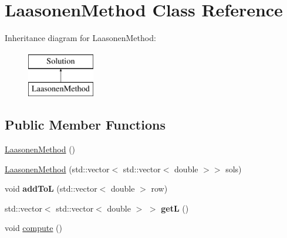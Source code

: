 \hypertarget{class_laasonen_method}{}\section{Laasonen\+Method Class Reference}
\label{class_laasonen_method}
Inheritance diagram for Laasonen\+Method\+:\begin{figure}[H]
\begin{center}
\leavevmode
\includegraphics[height=2.000000cm]{class_laasonen_method}
\end{center}
\end{figure}
\subsection*{Public Member Functions}
\begin{DoxyCompactItemize}
\item 
\hyperlink{class_laasonen_method_a1bff2dc73fc66c3070fc7a187ff556f9}{Laasonen\+Method} ()
\item 
\hyperlink{class_laasonen_method_a55dc0b88c2298a492d186564b9baed26}{Laasonen\+Method} (std\+::vector$<$ std\+::vector$<$ double $>$$>$ sols)
\item 
\mbox{\label{class_laasonen_method_a8eb364e47a161f8ca4700c8899786910}} 
void {\bfseries add\+ToL} (std\+::vector$<$ double $>$ row)
\item 
\mbox{\label{class_laasonen_method_a00aa549123730dc16651d06db8377523}} 
std\+::vector$<$ std\+::vector$<$ double $>$ $>$ {\bfseries getL} ()
\item 
void \hyperlink{class_laasonen_method_ac5507d58a6c59f0ba9eaa3ca54a51f5d}{compute} ()
\end{DoxyCompactItemize}
